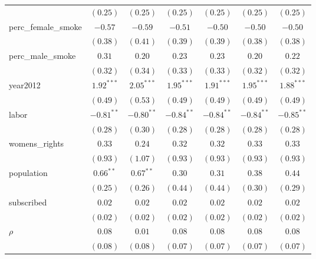 \begin{table}[!h]
\begin{center}
\begin{tabular}{l c c c c c c }
                        & $(0.25)$     & $(0.25)$     & $(0.25)$     & $(0.25)$     & $(0.25)$     & $(0.25)$     \\
perc\_female\_smoke     & $-0.57$      & $-0.59$      & $-0.51$      & $-0.50$      & $-0.50$      & $-0.50$      \\
                        & $(0.38)$     & $(0.41)$     & $(0.39)$     & $(0.39)$     & $(0.38)$     & $(0.38)$     \\
perc\_male\_smoke       & $0.31$       & $0.20$       & $0.23$       & $0.23$       & $0.20$       & $0.22$       \\
                        & $(0.32)$     & $(0.34)$     & $(0.33)$     & $(0.33)$     & $(0.32)$     & $(0.32)$     \\
year2012                & $1.92^{***}$ & $2.05^{***}$ & $1.95^{***}$ & $1.91^{***}$ & $1.95^{***}$ & $1.88^{***}$ \\
                        & $(0.49)$     & $(0.53)$     & $(0.49)$     & $(0.49)$     & $(0.49)$     & $(0.49)$     \\
labor                   & $-0.81^{**}$ & $-0.80^{**}$ & $-0.84^{**}$ & $-0.84^{**}$ & $-0.84^{**}$ & $-0.85^{**}$ \\
                        & $(0.28)$     & $(0.30)$     & $(0.28)$     & $(0.28)$     & $(0.28)$     & $(0.28)$     \\
womens\_rights          & $0.33$       & $0.24$       & $0.32$       & $0.32$       & $0.33$       & $0.33$       \\
                        & $(0.93)$     & $(1.07)$     & $(0.93)$     & $(0.93)$     & $(0.93)$     & $(0.93)$     \\
population              & $0.66^{**}$  & $0.67^{**}$  & $0.30$       & $0.31$       & $0.38$       & $0.44$       \\
                        & $(0.25)$     & $(0.26)$     & $(0.44)$     & $(0.44)$     & $(0.30)$     & $(0.29)$     \\
subscribed              & $0.02$       & $0.02$       & $0.02$       & $0.02$       & $0.02$       & $0.02$       \\
                        & $(0.02)$     & $(0.02)$     & $(0.02)$     & $(0.02)$     & $(0.02)$     & $(0.02)$     \\
$\rho$                  & $0.08$       & $0.01$       & $0.08$       & $0.08$       & $0.08$       & $0.08$       \\
                        & $(0.08)$     & $(0.08)$     & $(0.07)$     & $(0.07)$     & $(0.07)$     & $(0.07)$     \\

\end{tabular}
\end{center}
\end{table}
